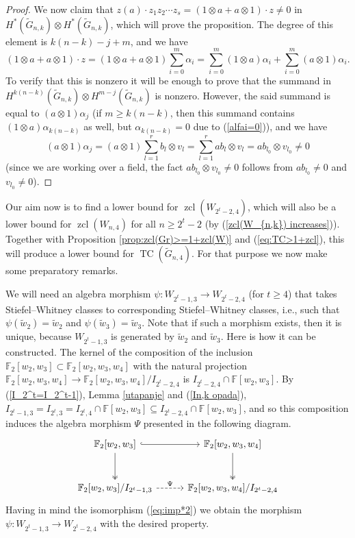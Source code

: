 \documentclass{amsart}
\theoremstyle{definition}
\theoremstyle{remark}
\numberwithin{equation}{section}
\newcommand{\F}{\mathbb F}
\newcommand{\gr}{\widetilde G}
\newcommand{\w}{\widetilde w}
\newcommand{\zcl}{\operatorname{zcl}}
\newcommand{\tc}{\operatorname{TC}}
\newcommand{\arr}{\rightarrow}
\renewcommand{\ge}{\geqslant}
\begin{document}
\begin{proof}
We now claim that $z(a)\cdot z_1z_2\cdots z_s=(1\otimes a+a\otimes1)\cdot z\ne0$ in $H^*(\gr_{n,k})\otimes H^*(\gr_{n,k})$, which will prove the proposition. The degree of this element is $k(n-k)-j+m$, and we have
\[(1\otimes a+a\otimes1)\cdot z=(1\otimes a+a\otimes1)\sum_{i = 0}^m\alpha_i =\sum_{i = 0}^m (1\otimes a)\alpha_i+\sum_{i = 0}^m (a\otimes 1)\alpha_i.\]
To verify that this is nonzero it will be enough to prove that the summand in $H^{k(n-k)}(\gr_{n,k})\otimes H^{m-j}(\gr_{n,k})$ is nonzero. However, the said summand is equal to $(a\otimes 1)\alpha_j$ (if $m\ge k(n-k)$, then this summand contains $(1\otimes a)\alpha_{k(n-k)}$ as well, but $\alpha_{k(n-k)}=0$ due to (\ref{alfai=0})), and we have
\[(a\otimes 1)\alpha_j= (a\otimes 1)\sum_{l=1}^r b_l\otimes v_l = \sum_{l=1}^r ab_l\otimes v_l = ab_{l_0}\otimes v_{l_0}\ne 0\]
(since we are working over a field, the fact $ab_{l_0}\otimes v_{l_0}\ne 0$ follows from $ab_{l_0}\ne0$ and $v_{l_0}\ne0$).
\end{proof}



Our aim now is to find a lower bound for $\zcl(W_{2^t-2,4})$, which will also be a lower bound for $\zcl(W_{n,4})$ for all $n\ge2^t-2$ (by (\ref{zcl(W_{n,k}) increases})). Together with Proposition \ref{prop:zcl(Gr)>=1+zcl(W)} and (\ref{eq:TC>1+zcl}), this will produce a lower bound for $\tc(\gr_{n,4})$. For that purpose we now make some preparatory remarks.

\medskip

We will need an algebra morphism $\psi:W_{2^t-1,3}\arr W_{2^t-2,4}$ (for $t\ge4$) that takes Stiefel--Whitney classes to corresponding Stiefel--Whitney classes, i.e., such that $\psi(\w_2)=\w_2$ and $\psi(\w_3)=\w_3$. Note that if such a morphism exists, then it is unique, because $W_{2^t-1,3}$ is generated by $\w_2$ and $\w_3$. Here is how it can be constructed.
The kernel of the composition of the inclusion $\F_2[w_2,w_3]\subset\F_2[w_2,w_3,w_4]$ with the natural projection $\F_2[w_2,w_3,w_4]\arr\F_2[w_2,w_3,w_4]/I_{2^t-2,4}$ is $I_{2^t-2,4}\cap\F[w_2,w_3]$. By (\ref{I_2^t=I_2^t-1}), Lemma \ref{utapanje} and (\ref{In,k opada}), $I_{2^t-1,3}=I_{2^t,3}=I_{2^t,4}\cap\F[w_2,w_3]\subseteq I_{2^t-2,4}\cap\F[w_2,w_3]$, and so this composition induces the algebra morphism $\Psi$ presented in the following diagram.
\[
\begin{tikzcd}[row sep = 1cm, column sep = 1cm]
    \F_2[w_2,w_3]
    \arrow[hook]{r}
    \arrow[twoheadrightarrow]{d}
    &
    \F_2[w_2,w_3,w_4]
    \arrow[twoheadrightarrow]{d}
    \\
    \F_2[w_2,w_3]/I_{2^t-1,3}
    \arrow[dashed]{r}{\Psi}
    &
    \F_2[w_2,w_3,w_4]/I_{2^t-2,4}
\end{tikzcd}
\]
Having in mind the isomorphism (\ref{eq:imp*2}) we obtain the morphism $\psi:W_{2^t-1,3}\arr W_{2^t-2,4}$ with the desired property.
\end{document}

